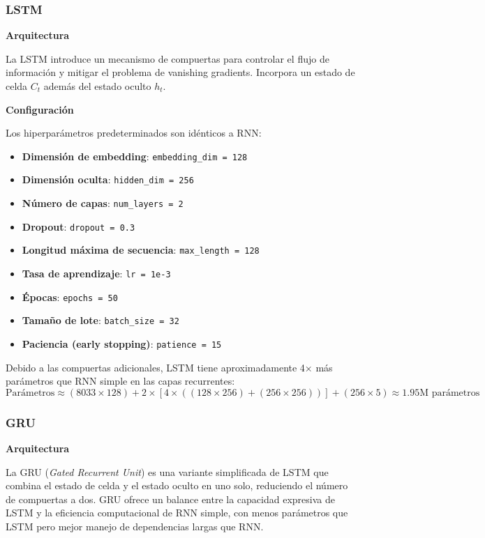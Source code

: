 \documentclass[paper=letter, fontsize=11pt, draft=false]{scrartcl}
\numberwithin{equation}{section} %
\numberwithin{figure}{section} %
\numberwithin{table}{section} %
\numberwithin{subsection}{section}
\begin{document}
\subsubsection{LSTM}

\textbf{Arquitectura}

La LSTM introduce un mecanismo de compuertas para controlar el flujo de información y mitigar el problema de vanishing gradients. Incorpora un estado de celda $C_t$ además del estado oculto $h_t$.

\textbf{Configuración}

Los hiperparámetros predeterminados son idénticos a RNN:
\begin{itemize}
    \item \textbf{Dimensión de embedding}: \texttt{embedding\_dim = 128}
    \item \textbf{Dimensión oculta}: \texttt{hidden\_dim = 256}
    \item \textbf{Número de capas}: \texttt{num\_layers = 2}
    \item \textbf{Dropout}: \texttt{dropout = 0.3}
    \item \textbf{Longitud máxima de secuencia}: \texttt{max\_length = 128}
    \item \textbf{Tasa de aprendizaje}: \texttt{lr = 1e-3}
    \item \textbf{Épocas}: \texttt{epochs = 50}
    \item \textbf{Tamaño de lote}: \texttt{batch\_size = 32}
    \item \textbf{Paciencia (early stopping)}: \texttt{patience = 15}
\end{itemize}

Debido a las compuertas adicionales, LSTM tiene aproximadamente 4× más parámetros que RNN simple en las capas recurrentes:
\[
\text{Parámetros} \approx (8033 \times 128) + 2 \times [4 \times ((128 \times 256) + (256 \times 256))] + (256 \times 5) \approx 1.95 \text{M parámetros}
\]

\subsubsection{GRU}

\textbf{Arquitectura}

La GRU (\textit{Gated Recurrent Unit}) es una variante simplificada de LSTM que combina el estado de celda y el estado oculto en uno solo, reduciendo el número de compuertas a dos. GRU ofrece un balance entre la capacidad expresiva de LSTM y la eficiencia computacional de RNN simple, con menos parámetros que LSTM pero mejor manejo de dependencias largas que RNN.
\end{document}
